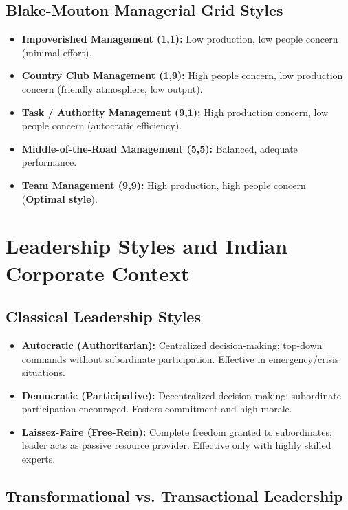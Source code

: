 \documentclass[11pt,a4paper]{article}
\begin{document}
\subsection{Blake-Mouton Managerial Grid Styles}
\begin{itemize}[leftmargin=*, itemsep=3pt]
  \item \textbf{Impoverished Management (1,1):} Low production, low people concern (minimal effort).
  \item \textbf{Country Club Management (1,9):} High people concern, low production concern (friendly atmosphere, low output).
  \item \textbf{Task / Authority Management (9,1):} High production concern, low people concern (autocratic efficiency).
  \item \textbf{Middle-of-the-Road Management (5,5):} Balanced, adequate performance.
  \item \textbf{Team Management (9,9):} High production, high people concern (\textbf{Optimal style}).
\end{itemize}

\section{Leadership Styles and Indian Corporate Context}

\subsection{Classical Leadership Styles}
\begin{itemize}[leftmargin=*, itemsep=4pt]
  \item \textbf{Autocratic (Authoritarian):} Centralized decision-making; top-down commands without subordinate participation. Effective in emergency/crisis situations.
  \item \textbf{Democratic (Participative):} Decentralized decision-making; subordinate participation encouraged. Fosters commitment and high morale.
  \item \textbf{Laissez-Faire (Free-Rein):} Complete freedom granted to subordinates; leader acts as passive resource provider. Effective only with highly skilled experts.
\end{itemize}

\subsection{Transformational vs. Transactional Leadership}
\end{document}
